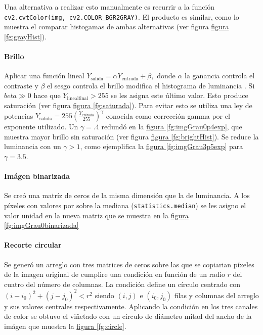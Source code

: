\documentclass{article}
\begin{document}
Una alternativa a realizar esto manualmente es recurrir a la función \verb'cv2.cvtColor(img, cv2.COLOR_BGR2GRAY)'.
El producto es similar, como lo muestra el comparar histogamas de ambas alternativas (ver figura \hyperref[fg:grayHist]{figura \ref*{fg:grayHist}}).


\paragraph{Brillo}
Aplicar una función lineal 
$
Y_\mathrm{salida} = \alpha Y_\mathrm{entrada} + \beta ,
$
donde $\alpha$ la ganancia controla el contraste y $\beta$ el sesgo controla el brillo modifica el histograma de luminancia \cite{noauthor_opencv_nodate}.
Si \(beta \gg 0\) hace que \(Y_\mathrm{lineal final}> 255\) se les asigna este último valor.
Esto produce saturación (ver figura \hyperref[fg:saturada]{figura \ref*{fg:saturada}}).
Para evitar esto se utiliza una ley de potencias
\(
Y_\mathrm{salida} = 255 \left( \frac{Y_\mathrm{entrada}}{255} \right)^\gamma  
\)
conocida como corrección gamma por el exponente utilizado.
Un \(\gamma= .4\) redundó en la \hyperref[fg:imgGrau0p4exp]{figura \ref*{fg:imgGrau0p4exp}}, que muestra mayor brillo sin saturación (ver figura \hyperref[fg:grayHist]{figura \ref*{fg:brightHist}}).
Se reduce la luminancia con un \(\gamma >1\), como ejemplifica la \hyperref[fg:imgGrau3p5exp]{figura \ref*{fg:imgGrau3p5exp}} para \(\gamma = 3.5\).



\paragraph{Imágen binarizada}	
Se creó una matríz de ceros de la misma dimensión que la de luminancia.
A los píxeles con valores por sobre la mediana (\verb'statistics.median') se les asigno el valor unidad en la nueva matriz que se muestra en la \hyperref[fg:imgGrau0binarizada]{figura \ref*{fg:imgGrau0binarizada}}






\paragraph{Recorte circular}
Se generó un arreglo con tres matrices de ceros sobre las que se copiarian píxeles de la imagen original de cumplire una condición en función de un radio \(r\) del cuatro del número de columnas.
La condición define un círculo centrado con \((i- i_0)^2 + (j- j_0)^2 < r^2\) siendo \((i,j)\) e \((i_0, j_0)\) filas y columnas del arreglo y sus valores centrales respectivamente.
Aplicando la condición en los tres canales de color se obtuvo el viñetado con un círculo de diámetro mitad del ancho de la imágen que muestra la \hyperref[fg:circle]{figura \ref*{fg:circle}}. 
\end{document}

